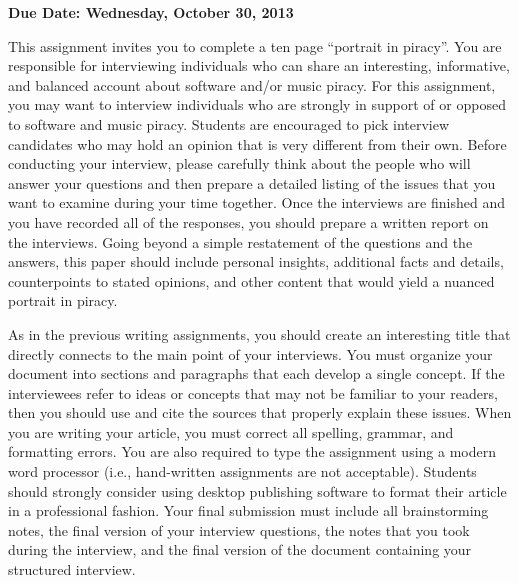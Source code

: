 

\usepackage[compact]{titlesec}



\vspace*{-.2in}
\begin{center}
	{\bf Due Date: Wednesday, October 30, 2013}
\end{center}

This assignment invites you to complete a ten page ``portrait in piracy''.  You are responsible for interviewing
individuals who can share an interesting, informative, and balanced account about software and/or music piracy. 
For this assignment, you may want to interview individuals who are strongly in support of or opposed to software and music
piracy. Students are encouraged to pick interview candidates who may hold an opinion that is very different from their
own. Before conducting your interview, please carefully think about the people who will answer your questions and
then prepare a detailed listing of the issues that you want to examine during your time together. Once the interviews are
finished and you have recorded all of the responses, you should prepare a written report on the interviews.  Going beyond a
simple restatement of the questions and the answers, this paper should include personal insights, additional facts and
details, counterpoints to stated opinions, and other content that would yield a nuanced portrait in piracy.

As in the previous writing assignments, you should create an interesting title that directly connects to the main point
of your interviews. You must organize your document into sections and paragraphs that each develop a single concept. If
the interviewees refer to ideas or concepts that may not be familiar to your readers, then you should use and cite the
sources that properly explain these issues. When you are writing your article, you must correct all spelling, grammar,
and formatting errors. You are also required to type the assignment using a modern word processor (i.e., hand-written
assignments are not acceptable). Students should strongly consider using desktop publishing software to format their
article in a professional fashion. Your final submission must include all brainstorming notes, the
final version of your interview questions, the notes that you took during the interview, and the final version of the
document containing your structured interview.

